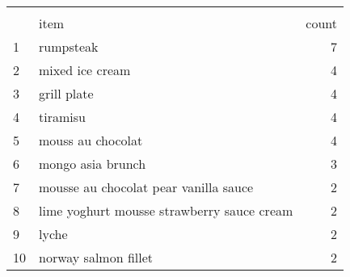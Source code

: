 \begin{tabular}{llr}
\\[-1.8ex]\hline
\hline \\[-1.8ex]
{} &                                               item &  count \\
\midrule
1   &                                          rumpsteak &      7 \\
2   &                                    mixed ice cream &      4 \\
3   &                                        grill plate &      4 \\
4   &                                           tiramisu &      4 \\
5   &                                  mouss au chocolat &      4 \\
6   &                                  mongo asia brunch &      3 \\
7   &              mousse au chocolat pear vanilla sauce &      2 \\
8   &         lime yoghurt mousse strawberry sauce cream &      2 \\
9   &                                              lyche &      2 \\
10  &                               norway salmon fillet &      2 \\
\bottomrule
\end{tabular}
